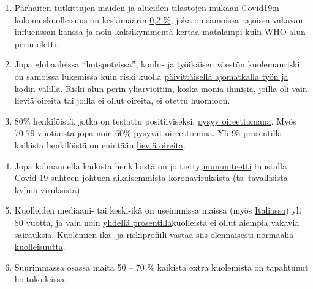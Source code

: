 \begin{enumerate}
\def\labelenumi{\arabic{enumi}.}
\tightlist
\item
  Parhaiten tutkittujen maiden ja alueiden tilastojen mukaan Covid19:n
  kokonaiskuolleisuus on keskimäärin
  \href{https://swprs.org/studies-on-covid-19-lethality/}{0,2 \%}, joka
  on samoissa rajoissa vakavan
  \href{https://www.ebm-netzwerk.de/en/publications/covid-19}{influenssan}
  kanssa ja noin kaksikymmentä kertaa matalampi kuin WHO alun perin
  \href{https://www.businessinsider.com/coronavirus-death-rate-by-age-countries-2020-3?r=US\&IR=T}{oletti}.
\item
  Jopa globaaleissa ``hotspoteissa'', koulu- ja työikäisen väestön
  kuolemanriski on samoissa lukemissa kuin riski kuolla
  \href{https://www.medrxiv.org/content/10.1101/2020.04.05.20054361v1}{päivittäisellä
  ajomatkalla työn ja kodin välillä}. Riski alun perin yliarvioitiin,
  koska monia ihmisiä, joilla oli vain lieviä oireita tai joilla ei
  ollut oireita, ei otettu huomioon.
\item
  80\% henkilöistä, jotka on testattu positiiviseksi,
  \href{https://www.bmj.com/content/369/bmj.m1375}{pysyy oireettomana}.
  Myös 70-79-vuotiaista jopa
  \href{https://www.niid.go.jp/niid/en/2019-ncov-e/9407-covid-dp-fe-01.html}{noin
  60\%} pysyvät oireettomina. Yli 95 prosentilla kaikista henkilöistä on
  enintään
  \href{https://swprs.org/studies-on-covid-19-lethality/\#hospitalizations}{lieviä
  oireita}.
\item
  Jopa kolmannella kaikista henkilöistä on jo tietty
  \href{https://www.medrxiv.org/content/10.1101/2020.04.17.20061440v1}{immuniteetti}
  taustalla Covid-19 suhteen johtuen aikaisemmista koronaviruksista (ts.
  tavallisista kylmä viruksista).
\item
  Kuolleiden mediaani- tai keski-ikä on useimmissa maissa (myös
  \href{https://www.epicentro.iss.it/coronavirus/sars-cov-2-decessi-italia}{Italiassa})
  yli 80 vuotta, ja vain noin
  \href{https://www.bloomberg.com/news/articles/2020-03-18/99-of-those-who-died-from-virus-had-other-illness-italy-says}{yhdellä
  prosentilla}kuolleista ei ollut aiempia vakavia sairauksia. Kuolemien
  ikä- ja riskiprofiili vastaa siis olennaisesti
  \href{https://www.vienna.at/analyse-zeigt-covid-19-opferkurve-entspricht-normaler-mortalitaet/6581246}{normaalia
  kuolleisuutta}.
\item
  Suurimmassa osassa maita 50 -- 70 \% kaikista extra kuolemista on
  tapahtunut
  \href{https://ltccovid.org/2020/04/12/mortality-associated-with-covid-19-outbreaks-in-care-homes-early-international-evidence/}{hoitokodeissa},

\end{enumerate}
